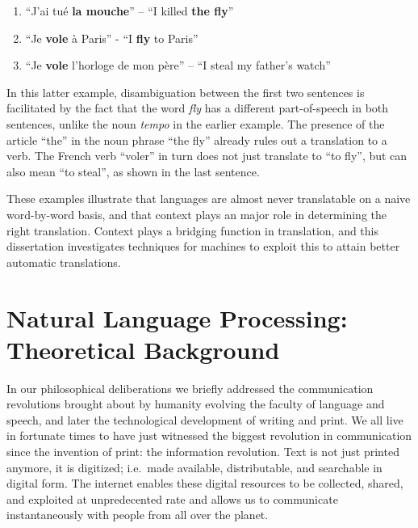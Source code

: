 \begin{enumerate}
\item ``J'ai tué \textbf{la mouche}'' -- ``I killed \textbf{the fly}''
\item ``Je \textbf{vole} à Paris'' - ``I \textbf{fly} to Paris''
\item ``Je \textbf{vole} l'horloge de mon père'' -- ``I steal my father's watch''
\end{enumerate}

In this latter example, disambiguation between the first two sentences is
facilitated by the fact that the word \emph{fly} has a different
part-of-speech in both sentences, unlike the noun \emph{tempo} in the earlier example.
The presence of the article ``the'' in the noun phrase ``the fly'' already
rules out a translation to a verb. The French verb ``voler'' in turn does not
just translate to ``to fly'', but can also mean ``to steal'', as shown in
the last sentence. 

These examples illustrate that languages are almost never translatable on a naive
word-by-word basis, and that context plays an major role in determining the
right translation. Context plays a bridging function in translation, and this
dissertation investigates techniques for machines to exploit this to attain
better automatic translations.

\section{Natural Language Processing: Theoretical Background}

In our philosophical deliberations we briefly addressed the communication
revolutions brought about by humanity evolving the faculty of language and
speech, and later the technological development of writing and print. We all
live in fortunate times to have just witnessed the biggest revolution in
communication since the invention of print: the information revolution. Text is
not just printed anymore, it is digitized; i.e.\ made available, distributable,
and searchable in digital form. The internet enables these digital resources to
be collected, shared, and exploited at unpredecented rate and allows us to
communicate instantaneously with people from all over the planet. 


